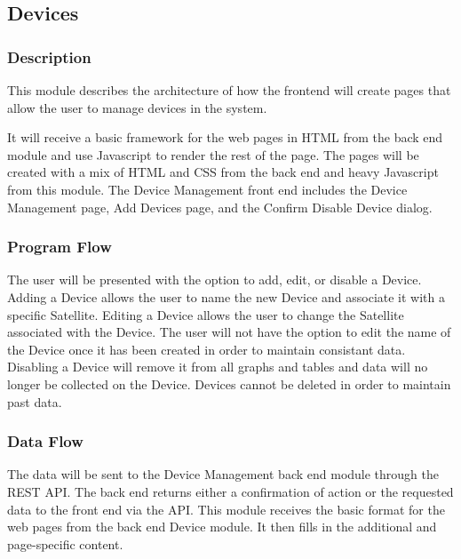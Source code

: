 
\subsection{Devices}

\subsubsection{Description}

This module describes the architecture of how the frontend will create pages that allow the user to manage devices in the system. 

It will receive a basic framework for the web pages in HTML from the back end module and use Javascript to render the rest of the page. 
The pages will be created with a mix of HTML and CSS from the back end and heavy Javascript from this module. 
The Device Management front end includes the Device Management page, Add Devices page, and the Confirm Disable Device dialog. 

\subsubsection{Program Flow}

The user will be presented with the option to add, edit, or disable a Device. 
Adding a Device allows the user to name the new Device and associate it with a specific Satellite. 
Editing a Device allows the user to change the Satellite associated with the Device. 
The user will not have the option to edit the name of the Device once it has been created in order to maintain consistant data. 
Disabling a Device will remove it from all graphs and tables and data will no longer be collected on the Device.
Devices cannot be deleted in order to maintain past data.

\subsubsection{Data Flow}

The data will be sent to the Device Management back end module through the REST API. 
The back end returns either a confirmation of action or the requested data to the front end via the API. 
This module receives the basic format for the web pages from the back end Device module. 
It then fills in the additional and page-specific content. 


